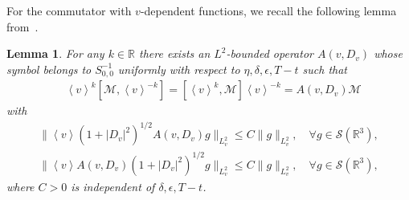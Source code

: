 \documentclass[11pt,american, reqno]{amsart}
\numberwithin{equation}{section}
\newtheorem{lemma}[theorem]{Lemma}
\newcommand{\R}{\mathbb R}
\newcommand{\1}{\mathds{1}}
\newcommand{\CalM}{\mathcal{M}}
\newcommand{\Eps}{\epsilon}
\newcommand{\vint}[1]{\left\langle#1\right\rangle}
\numberwithin{equation}{section}
\begin{document}
For the commutator with $v$-dependent functions, we recall the following lemma from~\cite{AMSY2020}.
\begin{lemma} \label{lem:M-comm-v}
For any $k \in \R$ there exists an $L^2$-bounded operator $A(v, D_v)$ whose symbol belongs
to $S^{-1}_{0,0}$ uniformly with respect to $\eta, \delta, \Eps, T-t$
such that 
\begin{align*}
&\vint{v}^k [\CalM, \vint{v}^{-k}] = [\vint{v}^k , \CalM] \vint{v}^{-k} = A(v, D_v) \CalM
\end{align*}
with
\begin{align*}
\|\vint{v} ( 1+ |D_v|^2)^{1/2}  A(v,D_v) g\|_{L^2_v} 
\leq C \|g\|_{L^2_v}, \quad %
\forall g \in \mathcal{S}(\R^3),
\\[3pt]
\|\vint{v} A(v,D_v) (1+ |D_v|^2)^{1/2}   g\|_{L^2_v} \le C \|g\|_{L^2_v}, \quad %
\forall g \in \mathcal{S}(\R^3),
\end{align*}
where $C >0$ is independent of $\delta, \Eps, T-t$.  
\end{lemma}
\end{document}
